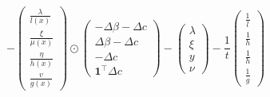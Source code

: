 \documentclass{article}
\begin{document}
 \begin{equation}
     -\left(\begin{array}{c}
\frac{\lambda}{l(x)} \\
\frac{\xi}{\mu(x)} \\
\frac{\eta}{h(x)} \\
\frac{v}{g(x)}
\end{array}\right) \odot\left(\begin{array}{c}
-\Delta \beta-\Delta c \\
\Delta \beta-\Delta c \\
-\Delta c \\
\boldsymbol{1}^{\top} \Delta c
\end{array}\right)-\left(\begin{array}{c}
\lambda \\
\xi \\
y \\
\nu
\end{array}\right)-\frac{1}{t}\left(\begin{array}{c}
\frac{1}{l} \\
\frac{1}{h} \\
\frac{1}{h} \\
\frac{1}{g}
\end{array}\right)
 \end{equation}
\end{document}

